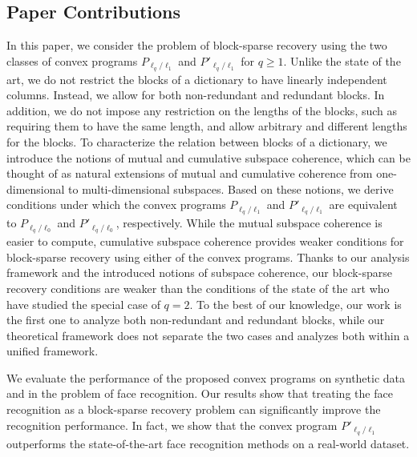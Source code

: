 \documentclass[10pt,twocolumn,twoside] {IEEEtran}
\begin{document}
\subsection{Paper Contributions}
In this paper, we consider the problem of block-sparse recovery using the two classes of convex programs $P_{\ell_q/\ell_1}$ and $P'_{\ell_q/\ell_1}$ for $q \geq 1$. Unlike the state of the art, we do not restrict the blocks of a dictionary to have linearly independent columns. Instead, we allow for both non-redundant and redundant blocks. In addition, we do not impose any restriction on the lengths of the blocks, such as requiring them to have the same length, and allow arbitrary and different lengths for the blocks. To characterize the relation between blocks of a dictionary, we introduce the notions of mutual and cumulative subspace coherence, which can be thought of as natural extensions of mutual and cumulative coherence from one-dimensional to multi-dimensional subspaces. 
Based on these notions, we derive conditions under which the convex programs $P_{\ell_q/\ell_1}$ and $P'_{\ell_q/\ell_1}$ are equivalent to $P_{\ell_q/\ell_0}$ and $P'_{\ell_q/\ell_0}$, respectively. While the mutual subspace coherence is easier to compute, cumulative subspace coherence provides weaker conditions for block-sparse recovery using either of the convex programs. Thanks to our analysis framework and the introduced notions of subspace coherence, our block-sparse recovery conditions are weaker than the conditions of the state of the art who have studied the special case of $q=2$. To the best of our knowledge, our work is the first one to analyze both non-redundant and redundant blocks, while our theoretical framework does not separate the two cases and analyzes both within a unified framework.
  

We evaluate the performance of the proposed convex programs on synthetic data and in the problem of face recognition. Our results show that treating the face recognition as a block-sparse recovery problem can significantly improve the recognition performance. In fact, we show that the convex program $P'_{\ell_q/\ell_1}$ outperforms the state-of-the-art face recognition methods on a real-world dataset.
\end{document}
